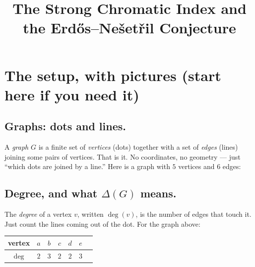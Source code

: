 \documentclass[11pt]{article}
\title{\textbf{The Strong Chromatic Index and the Erd\H{o}s--Ne\v{s}et\v{r}il Conjecture}}
\author{}
\date{}
\begin{document}
\maketitle

\vspace{-2em}

\section*{The setup, with pictures (start here if you need it)}

\subsection*{Graphs: dots and lines.}

A \emph{graph} $G$ is a finite set of \emph{vertices} (dots) together
with a set of \emph{edges} (lines) joining some pairs of vertices.
That is it. No coordinates, no geometry --- just ``which dots are
joined by a line.'' Here is a graph with $5$ vertices and $6$ edges:

\begin{center}
\end{center}

\subsection*{Degree, and what $\Delta(G)$ means.}

The \emph{degree} of a vertex $v$, written $\deg(v)$, is the number of
edges that touch it. Just count the lines coming out of the dot. For
the graph above:

\begin{center}
\begin{tabular}{c|cccccc}
vertex & $a$ & $b$ & $c$ & $d$ & $e$ \\
\hline
$\deg$ & $2$ & $3$ & $2$ & $2$ & $3$ \\
\end{tabular}
\end{center}
\end{document}
